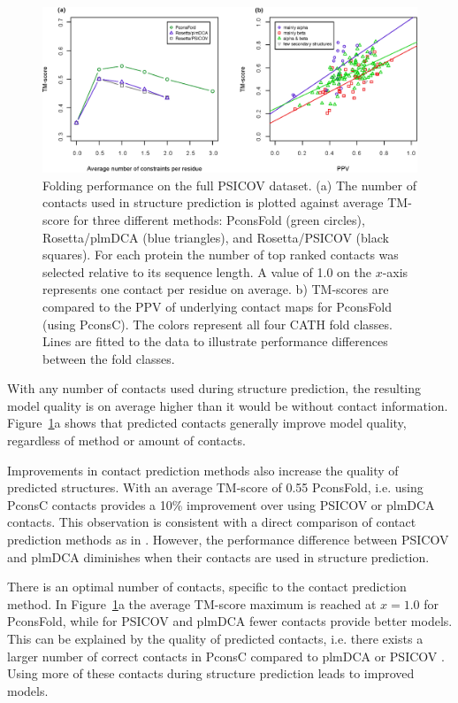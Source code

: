 \documentclass{bioinfo}
\begin{document}
\begin{figure}[!tpb]%
\centerline{\includegraphics[scale=0.7]{figures/tmscores.eps}}
\caption{Folding performance on the full PSICOV dataset. (a) The 
 number of contacts used in structure prediction is
 plotted against average TM-score for three different methods:
 PconsFold (green circles), Rosetta/plmDCA (blue triangles), and
 Rosetta/PSICOV (black squares). For each protein the number of top
 ranked contacts was selected relative to its sequence length. A value
 of 1.0 on the $x$-axis represents one
 contact per residue on average. b) TM-scores are compared
 to the PPV of underlying contact maps for PconsFold (using
 PconsC). The colors represent all four CATH fold classes. Lines 
 are fitted to the data to illustrate performance differences between the fold classes.}\label{fig:main}
\end{figure}

With any number of contacts used during structure prediction, the
resulting model quality is on average higher than it would be without
contact information. Figure~\ref{fig:main}a shows that predicted contacts generally improve model
quality, regardless of method or amount of contacts. 


Improvements in contact prediction methods also increase the quality
of predicted structures. With an average TM-score of 0.55
PconsFold, i.e. using PconsC contacts provides a 10\% improvement
over using PSICOV or plmDCA contacts. This observation is consistent
with a direct comparison of contact prediction methods as in
\citeauthor{skwark_PconsC:_2013}
\citeyear{skwark_PconsC:_2013}. However, the performance difference
between PSICOV and plmDCA diminishes when their contacts are used in
structure prediction. 


There is an optimal number of contacts, specific to the contact
prediction method. In Figure~\ref{fig:main}a the average TM-score
maximum is reached at $x=1.0$ for PconsFold, while for PSICOV and
plmDCA fewer contacts provide better models. This can be explained by
the quality of predicted contacts, i.e. there exists a larger number of
correct contacts in PconsC compared to plmDCA or PSICOV \cite[]{skwark_PconsC:_2013}. Using more of these contacts during
structure prediction leads to improved models.
\end{document}
